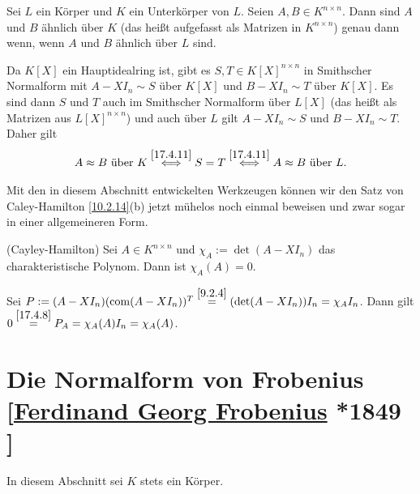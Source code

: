 \documentclass[../../main.tex]{subfiles}
\begin{document}
\begin{pro}\label{17.4.14}
    Sei $L$ ein Körper und $K$ ein Unterkörper von $L$. Seien $A,B\in K^{n\times n}$. Dann sind $A$ und $B$ ähnlich über $K$ (das heißt aufgefasst als Matrizen in $K^{n\times n}$) genau dann wenn, wenn $A$ und $B$ ähnlich über $L$ sind.
\end{pro}
\begin{cproof}
    Da $K[X]$ ein Hauptidealring ist, gibt es $S,T\in K[X]^{n\times n}$ in Smithscher Normalform mit $A-XI_n\sim S$ über $K[X]$ und $B-XI_n\sim T$ über $K[X]$. Es sind dann $S$ und $T$ auch im Smithscher Normalform über $L[X]$ (das heißt als Matrizen aus $L[X]^{n\times n}$) und auch über $L$ gilt $A-XI_n\sim S$ und $B-XI_n\sim T$. Daher gilt
    \begin{align*}
        A\approx B\text{ über }K\stackrel{\ref{17.4.11}}{\Longleftrightarrow}S=T \stackrel{\ref{17.4.11}}{\Longleftrightarrow}A\approx B\text{ über }L.
    \end{align*}
\end{cproof}

Mit den in diesem Abschnitt entwickelten Werkzeugen können wir den Satz von Caley-Hamilton \ref{10.2.14}(b) jetzt mühelos noch einmal beweisen und zwar sogar in einer allgemeineren Form.

\begin{sat}\label{17.4.15}
    (Cayley-Hamilton) Sei $A\in K^{n\times n}$ und $\chi_A:=\det(A-XI_n)$ das charakteristische Polynom. Dann ist $\chi_A(A)=0$.
\end{sat}
\begin{cproof}
    Sei $P:=(A-XI_n)(\operatorname{com}(A-XI_n))^T\stackrel{\ref{9.2.4}}{=}(\det(A-XI_n))I_n=\chi_AI_n$. Dann gilt $0\stackrel{\ref{17.4.8}}{=}P_A=\chi_A(A)I_n=\chi_A(A)$.
\end{cproof}

\section[Die Normalform von Frobenius]{Die Normalform von Frobenius\\{\small[\href{https://de.wikipedia.org/wiki/Ferdinand_Georg_Frobenius}{Ferdinand Georg Frobenius} *1849 }]}
In diesem Abschnitt sei $K$ stets ein Körper.
\end{document}
